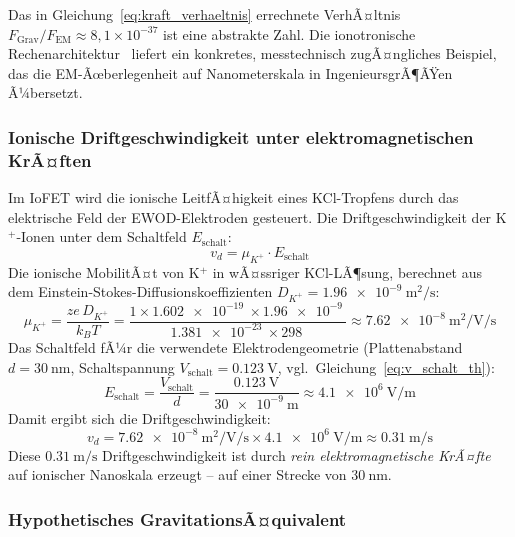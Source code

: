 ﻿\documentclass[12pt, a4paper]{report}
\theoremstyle{definition}
\theoremstyle{remark}
\begin{document}
Das in Gleichung~\eqref{eq:kraft_verhaeltnis} errechnete VerhÃ¤ltnis
$F_\text{Grav}/F_\text{EM} \approx 8{,}1 \times 10^{-37}$ ist eine abstrakte
Zahl. Die ionotronische Rechenarchitektur~\cite{ionotronik2026} liefert
ein konkretes, messtechnisch zugÃ¤ngliches Beispiel, das die EM-Ãœberlegenheit
auf Nanometerskala in IngenieursgrÃ¶ÃŸen Ã¼bersetzt.

\subsubsection{Ionische Driftgeschwindigkeit unter elektromagnetischen KrÃ¤ften}

Im IoFET wird die ionische LeitfÃ¤higkeit eines KCl-Tropfens durch das
elektrische Feld der EWOD-Elektroden gesteuert. Die Driftgeschwindigkeit
der K$^+$-Ionen unter dem Schaltfeld $E_\text{schalt}$:
\begin{equation}
  v_d = \mu_{K^+} \cdot E_\text{schalt}
  \label{eq:drift_iofet}
\end{equation}
Die ionische MobilitÃ¤t von K$^+$ in wÃ¤ssriger KCl-LÃ¶sung, berechnet aus dem
Einstein-Stokes-Diffusionskoeffizienten $D_{K^+} = \SI{1.96e-9}{\metre\squared\per\second}$:
\begin{equation}
  \mu_{K^+}
  = \frac{z e\, D_{K^+}}{k_B T}
  = \frac{1 \times \SI{1.602e-19}{} \times \SI{1.96e-9}{}}%
         {\SI{1.381e-23}{} \times \SI{298}{}}
  \approx \SI{7.62e-8}{\metre\squared\per\volt\per\second}
  \label{eq:mobilitaet_k}
\end{equation}
Das Schaltfeld fÃ¼r die verwendete Elektrodengeometrie
(Plattenabstand $d = \SI{30}{\nano\metre}$,
Schaltspannung $V_\text{schalt} = \SI{0.123}{\volt}$, vgl.\
Gleichung~\eqref{eq:v_schalt_th}):
\begin{equation}
  E_\text{schalt}
  = \frac{V_\text{schalt}}{d}
  = \frac{\SI{0.123}{\volt}}{\SI{30e-9}{\metre}}
  \approx \SI{4.1e6}{\volt\per\metre}
  \label{eq:feld_schalt}
\end{equation}
Damit ergibt sich die Driftgeschwindigkeit:
\begin{equation}
  v_d
  = \SI{7.62e-8}{\metre\squared\per\volt\per\second}
  \times \SI{4.1e6}{\volt\per\metre}
  \approx \SI{0.31}{\metre\per\second}
  \label{eq:vd_num}
\end{equation}
Diese $\SI{0.31}{\metre\per\second}$ Driftgeschwindigkeit ist durch
\emph{rein elektromagnetische KrÃ¤fte} auf ionischer Nanoskala erzeugt --
auf einer Strecke von $\SI{30}{\nano\metre}$.

\subsubsection{Hypothetisches GravitationsÃ¤quivalent}
\end{document}
